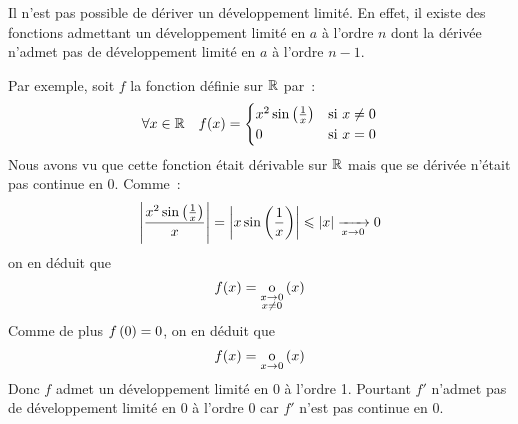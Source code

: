 \documentclass{magnolia}
\begin{document}
\begin{remarqueUnique}
\remarque Il n'est pas possible de dériver un développement limité.
  En effet, il existe des fonctions admettant un développement limité en $a$
  à l'ordre $n$ dont la dérivée n'admet pas de développement limité en $a$
  à l'ordre $n-1$.
  \begin{sol}
  Par exemple, soit $f$ la fonction définie sur $\mathbb{R}$ par~:
  \[\forall x\in\mathbb{R} \quad f(x)=
    \begin{cases}
    x^2\sin\left(\frac{1}{x}\right) & \text{si $x\neq 0$}\\
    0 & \text{si $x=0$}
    \end{cases}\]
  Nous avons vu que cette fonction était dérivable sur $\mathbb{R}$ mais que se dérivée
  n'était pas continue en 0. Comme~:
  \[\left|\frac{x^2\sin\left(\frac{1}{x}\right)}{x}\right|
    =\left|x\sin\left(\frac{1}{x}\right)\right|\leqslant\left|x\right|\xrightarrow[x\rightarrow 0]{}0\]
  on en déduit que
  \[f(x)=\underset{\substack{x \rightarrow 0\\x \neq 0}}{\text{o}} \left(x\right)\]
  Comme de plus $f\left(0\right)=0$, on en déduit que
  \[f(x)=\underset{x \rightarrow 0}{\text{o}}\left(x\right)\]
  Donc $f$ admet un développement limité en 0 à l'ordre 1. Pourtant $f'$ n'admet
  pas de développement limité en 0 à l'ordre 0 car $f'$ n'est pas continue en
  0.    
  \end{sol}
\end{remarqueUnique}
\end{document}
